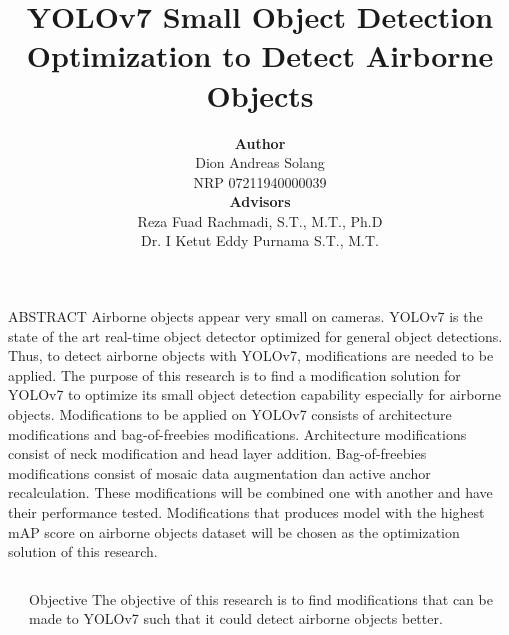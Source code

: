 \documentclass[final,hyperref={pdfpagelabels=false}]{beamer}
\title{\huge YOLOv7 Small Object Detection Optimization to Detect Airborne Objects} %
\author[Dion Solang]{ 
  \parbox[t]{7cm}{
    \textbf{Author}\\
    Dion Andreas Solang\\
    NRP 07211940000039
  }
  \parbox[t]{7cm}{
    \textbf{Advisors}\\
    Reza Fuad Rachmadi, S.T., M.T., Ph.D\\
    Dr. I Ketut Eddy Purnama S.T., M.T.
  }
} %
\institute{
  Department of Computer Engineering\\
  Institut Teknologi Sepuluh Nopember} %
\begin{document}

\begin{frame}[t] %

\begin{block}{ABSTRACT}
  Airborne objects appear very small on cameras.
  YOLOv7 is the state of the art real-time object detector optimized for general object detections.
  Thus, to detect airborne objects with YOLOv7, modifications are needed to be applied.
  The purpose of this research is to find a modification solution for YOLOv7 to optimize its small object detection capability especially for airborne objects.
  Modifications to be applied on YOLOv7 consists of architecture modifications and bag-of-freebies modifications.
  Architecture modifications consist of neck modification and head layer addition.
  Bag-of-freebies modifications consist of mosaic data augmentation dan active anchor recalculation.
  These modifications will be combined one with another and have their performance tested.
  Modifications that produces model with the highest mAP score on airborne objects dataset will be chosen as the optimization solution of this research.
\end{block}

\begin{columns}[t] %

\begin{column}{.02\textwidth}\end{column} %

\begin{column}{.465\textwidth} %


\begin{block}{Objective}
  The objective of this research is to find modifications that can be made to YOLOv7
  such that it could detect airborne objects better.
\end{block}

            

\end{column}
\end{columns}
\end{frame}
\end{document}
